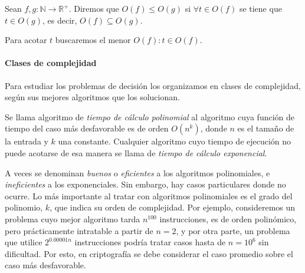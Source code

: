\begin{definition}
	Sean $f, g : \mathbb{N} \rightarrow \mathbb{R}^+$.
	Diremos que  $O(f) \leq O(g)$ si $\forall t \in O(f)$ se tiene que $t \in O(g)$, es decir,  $O(f) \subseteq O(g)$.
\end{definition}

Para acotar $t$ buscaremos el menor $O(f) : t\in O(f)$.


\hfil 

\paragraph{Clases de complejidad}

\hfil

 Para estudiar los problemas de decisión los organizamos en clases de complejidad, según sus mejores algoritmos que los solucionan.


\begin{definition}
	Se llama algoritmo de \textit{tiempo de cálculo polinomial} al algoritmo cuya función de tiempo del caso más desfavorable es de orden $O(n^k)$, donde $n$ es el tamaño de la entrada y $k$ una constante. Cualquier algoritmo cuyo tiempo de ejecución no puede acotarse de esa manera se llama de \textit{tiempo de cálculo exponencial}.
\end{definition}

A veces se denominan \textit{buenos} o \textit{eficientes} a los algoritmos polinomiales, e \textit{ineficientes} a los exponenciales. Sin embargo, hay casos particulares donde no ocurre. Lo más importante al tratar con algoritmos polinomiales es el grado del polinomio, $k$, que indica su orden de complejidad. Por ejemplo, consideremos un problema cuyo mejor algoritmo tarda $n^{100}$ instrucciones, es de orden polinómico, pero prácticamente intratable a partir de $n=2$, y por otra parte, un problema que utilice $2^{0.00001n}$ instrucciones podría tratar casos hasta de $n=10^6$ sin dificultad.
Por esto, en criptografía se debe considerar el caso promedio sobre el caso más desfavorable.


